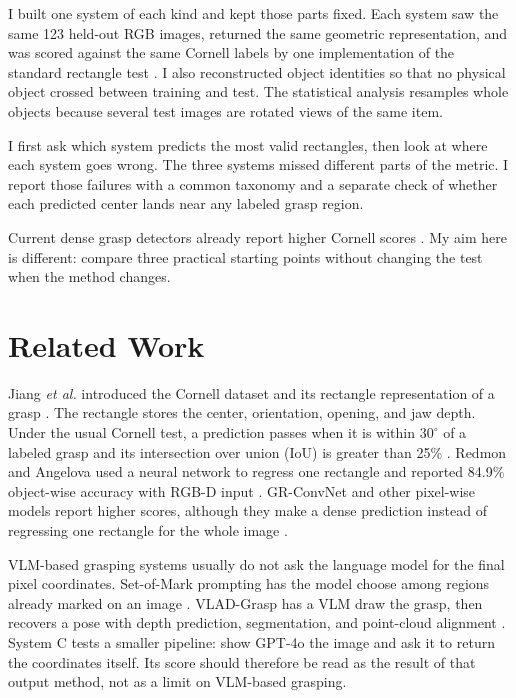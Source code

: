 \documentclass[10pt,conference,compsoc]{IEEEtran}
\begin{document}
I built one system of each kind and kept those parts fixed. Each system saw
the same 123 held-out RGB images, returned the same geometric representation,
and was scored against the same Cornell labels by one implementation of the
standard rectangle test \cite{jiang2011,lenz2015}. I also reconstructed
object identities so that no physical object crossed between training and
test. The statistical analysis resamples whole objects because several test
images are rotated views of the same item.

I first ask which system predicts the most valid rectangles, then look at
where each system goes wrong. The three systems missed different parts of the
metric. I report those failures with a common taxonomy and a separate check
of whether each predicted center lands near any labeled grasp region.

Current dense grasp detectors already report higher Cornell scores
\cite{kumra2020}. My aim here is different: compare three practical starting
points without changing the test when the method changes.

\section{Related Work}

Jiang \emph{et al.} introduced the Cornell dataset and its rectangle
representation of a grasp \cite{jiang2011}. The rectangle stores the center,
orientation, opening, and jaw depth. Under the usual Cornell test, a
prediction passes when it is within $30^\circ$ of a labeled grasp and its
intersection over union (IoU) is greater than 25\% \cite{lenz2015}. Redmon
and Angelova used a neural network to regress one rectangle and reported
84.9\% object-wise accuracy with RGB-D input \cite{redmon2015}. GR-ConvNet
and other pixel-wise models report higher scores, although they make a dense
prediction instead of regressing one rectangle for the whole image
\cite{kumra2020}.

VLM-based grasping systems usually do not ask the language model for the final
pixel coordinates. Set-of-Mark prompting has the model choose among regions
already marked on an image \cite{yang2024}. VLAD-Grasp has a VLM draw the
grasp, then recovers a pose with depth prediction, segmentation, and
point-cloud alignment \cite{kulshrestha2025}. System C tests a smaller
pipeline: show GPT-4o the image and ask it to return the coordinates itself.
Its score should therefore be read as the result of that output method, not
as a limit on VLM-based grasping.
\end{document}
